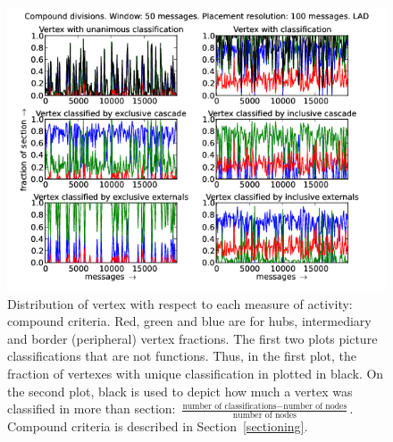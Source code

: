 \documentclass[%
 aip,
 jmp,%
 amsmath,amssymb,
 reprint,%
]{revtex4-1}
\begin{document}
\begin{figure}[hbtp] 
   \centering
        \includegraphics[width=\textwidth]{figs/LAD/50_2}
    \caption{Distribution of vertex with respect to each measure of activity: compound criteria. Red, green and blue are for hubs, intermediary and border (peripheral) vertex fractions. The first two plots picture classifications that are not functions. Thus, in the first plot, the fraction of vertexes with unique classification in plotted in black. On the second plot, black is used to depict how much a vertex was classified in more than section: $\frac{\text{number of classifications} - \text{number of nodes}}{\text{number of nodes}}$. Compound criteria is described in Section~\ref{sectioning}.}
    \label{fig:lad50_}
\end{figure}





%
%




\nocite{*}
\end{document}
